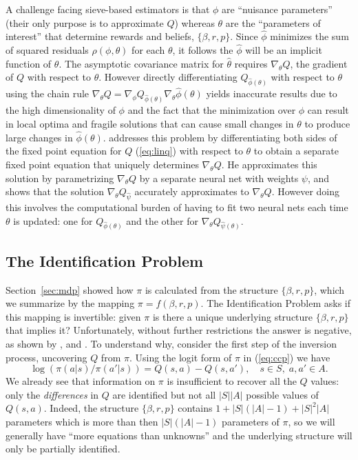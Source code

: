 A challenge facing sieve-based estimators is that $\phi$ are ``nuisance parameters'' 
(their only purpose is to approximate $Q$) whereas $\theta$ are the ``parameters of interest'' 
that determine  rewards and beliefs, $\{\beta,r,p\}$. Since $\hat\phi$  minimizes
the sum of squared residuals $\rho(\phi,\theta)$  for each $\theta$, it follows the $\hat\phi$ will be an implicit
function of $\theta$. The asymptotic covariance matrix for $\hat\theta$  requires $\nabla_\theta Q$, the gradient
of $Q$ with respect to $\theta$. However directly differentiating
$Q_{\hat\phi(\theta)}$ with respect to $\theta$ using the chain rule
 $\nabla_\theta Q=\nabla_\phi Q_{\hat\phi(\theta)}\nabla_\theta\hat\phi(\theta)$ yields inaccurate results due to the
high dimensionality of $\phi$ and the fact that the minimization over  $\phi$ can result in local optima and fragile
solutions that can cause small changes in $\theta$ to produce large changes in $\hat\phi(\theta)$. 
\citet{Nguyen:2025} addresses this problem by 
differentiating both sides of the fixed point equation for $Q$ (\ref{eq:linq}) with respect to $\theta$ 
to obtain a separate fixed point equation that uniquely determines  $\nabla_\theta Q$. 
He approximates this solution by parametrizing $\nabla_\theta Q$ by a separate neural net with 
weights $\psi$, and shows that the solution $\nabla_\theta Q_{\hat\psi}$ accurately approximates
to $\nabla_\theta Q$. However doing this involves the computational burden of having to fit
two neural nets each time $\theta$ is updated: one for $Q_{\hat\phi(\theta)}$ and the other for $\nabla_\theta Q_{\hat\psi(\theta)}$.





\subsection{The Identification Problem}
\label{section:identification}

Section~\ref{sec:mdp} showed how $\pi$ is calculated from the structure $\{\beta,r,p\}$, which
we summarize by the mapping $\pi=f(\beta,r,p)$. The Identification Problem asks if this mapping is invertible:
given $\pi$ is there a unique underlying structure $\{\beta,r,p\}$ that implies it? Unfortunately, without
further restrictions the answer is negative, as shown by \citet{hotzmiller:1993}, 
\citet{rust:1994} and \citet{magnacthesmar:2002}. 
To understand why,  consider the first step of the inversion process, uncovering  $Q$ from $\pi$.
Using the logit form of $\pi$ in (\ref{eq:ccp}) we have
\begin{equation}
               \log\left(\pi(a|s)/\pi(a'|s)\right) = Q(s,a)-Q(s,a'), \quad s \in S, \; a,a' \in A.
\label{eq:ccpinverse}
\end{equation}
We already see that information on $\pi$ is insufficient to recover all the $Q$ values: only the {\it differences\/} in
$Q$ are identified but  not all $|S||A|$ possible values of $Q(s,a)$. Indeed, the structure $\{\beta,r,p\}$ contains $1+|S|(|A|-1)+|S|^2|A|$  
parameters which is more than then $|S|(|A|-1)$ parameters of $\pi$, so we will generally have ``more equations than unknowns'' 
and the underlying structure will only be partially identified.

